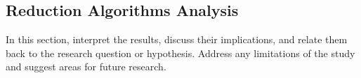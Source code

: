\subsection{Reduction Algorithms Analysis} %
\label{subsec:discussion-reduction}

In this section, interpret the results, discuss their implications, and relate them back to the research question or hypothesis. Address any limitations of the study and suggest areas for future research.


